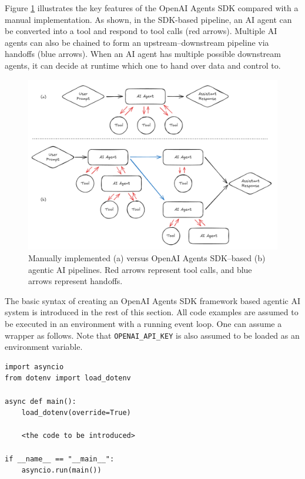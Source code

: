 Figure \ref{fig:openai_agents_sdk_pipeline} illustrates the key features of the OpenAI Agents SDK compared with a manual implementation. As shown, in the SDK-based pipeline, an AI agent can be converted into a tool and respond to tool calls (red arrows). Multiple AI agents can also be chained to form an upstream–downstream pipeline via handoffs (blue arrows). When an AI agent has multiple possible downstream agents, it can decide at runtime which one to hand over data and control to.

\begin{figure}[!htb]
	\centering
	\includegraphics[width=\textwidth]{./chapters/part-7/figures/openai_agents_sdk_pipeline.png}
	\caption{Manually implemented (a) versus OpenAI Agents SDK–based (b) agentic AI pipelines. Red arrows represent tool calls, and blue arrows represent handoffs.}
	\label{fig:openai_agents_sdk_pipeline}
\end{figure}

The basic syntax of creating an OpenAI Agents SDK framework based agentic AI system is introduced in the rest of this section. All code examples are assumed to be executed in an environment with a running event loop. One can assume a wrapper as follows. Note that \verb|OPENAI_API_KEY| is also assumed to be loaded as an environment variable.

\begin{lstlisting}
import asyncio
from dotenv import load_dotenv

async def main():
    load_dotenv(override=True)
    
    <the code to be introduced>

if __name__ == "__main__":
    asyncio.run(main())
\end{lstlisting}

